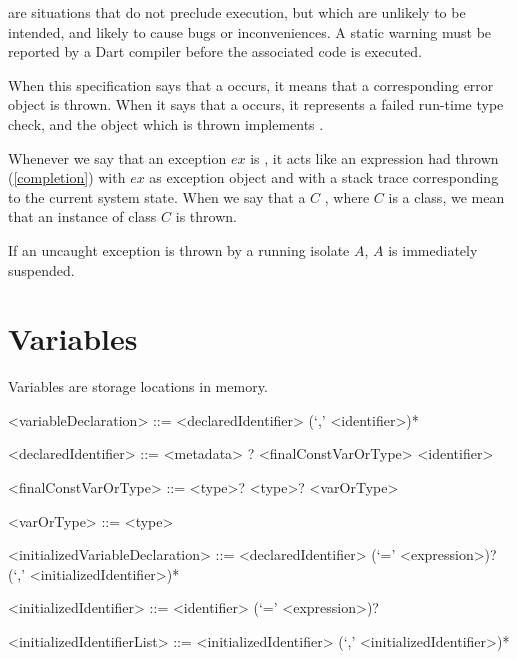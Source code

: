 \documentclass[makeidx]{article}
\begin{document}

\LMHash{}%
are situations that do not preclude execution,
but which are unlikely to be intended,
and likely to cause bugs or inconveniences.
A static warning must be reported by a Dart compiler before the associated code is executed.

\LMHash{}%
When this specification says that a  occurs,
it means that a corresponding error object is thrown.
When it says that a  occurs,
it represents a failed run-time type check,
and the object which is thrown implements .

\LMHash{}%
Whenever we say that an exception $ex$ is
,
it acts like an expression had thrown (\ref{completion})
with $ex$ as exception object and with a stack trace
corresponding to the current system state.
When we say that a $C$ ,
where $C$ is a class, we mean that an instance of class $C$ is thrown.

\LMHash{}%
If an uncaught exception is thrown by a running isolate $A$, $A$ is immediately suspended.


\section{Variables}

\LMHash{}%
Variables are storage locations in memory.

\begin{grammar}
<variableDeclaration> ::= <declaredIdentifier> (`,' <identifier>)*

<declaredIdentifier> ::= <metadata> \COVARIANT{}? <finalConstVarOrType> <identifier>

<finalConstVarOrType> ::= \FINAL{} <type>?
  \alt \CONST{} <type>?
  \alt <varOrType>

<varOrType> ::= \VAR{}
  \alt <type>

<initializedVariableDeclaration> ::= \gnewline{}
  <declaredIdentifier> (`=' <expression>)? (`,' <initializedIdentifier>)*

<initializedIdentifier> ::= <identifier> (`=' <expression>)?

<initializedIdentifierList> ::= <initializedIdentifier> (`,' <initializedIdentifier>)*
\end{grammar}
\end{document}
